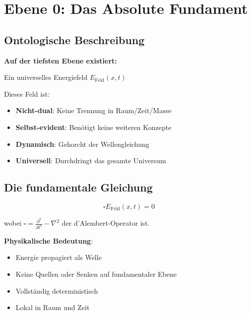 \section{Ebene 0: Das Absolute Fundament}

\subsection{Ontologische Beschreibung}

\begin{keyresult}
\textbf{Auf der tiefsten Ebene existiert:}

\begin{center}
 Ein universelles Energiefeld $E_{\text{Feld}}(x,t)$
\end{center}

\vspace{0.3cm}

Dieses Feld ist:
\begin{itemize}
\item \textbf{Nicht-dual}: Keine Trennung in Raum/Zeit/Masse
\item \textbf{Selbst-evident}: Benötigt keine weiteren Konzepte
\item \textbf{Dynamisch}: Gehorcht der Wellengleichung
\item \textbf{Universell}: Durchdringt das gesamte Universum
\end{itemize}
\end{keyresult}

\subsection{Die fundamentale Gleichung}

\begin{equation}
\boxed{\square E_{\text{Feld}}(x,t) = 0}
\end{equation}

wobei $\square = \frac{\partial^2}{\partial t^2} - \nabla^2$ der d'Alembert-Operator ist.

\textbf{Physikalische Bedeutung}:
\begin{itemize}
\item Energie propagiert als Welle
\item Keine Quellen oder Senken auf fundamentaler Ebene
\item Vollständig deterministisch
\item Lokal in Raum und Zeit
\end{itemize}


